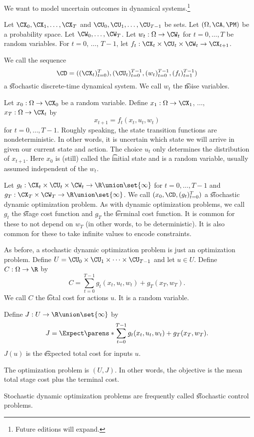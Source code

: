 

We want to model uncertain outcomes in dynamical systems.\footnote{Future editions will expand.}


Let $\CX_0, \CX_1, \dots, \CX_{T}$ and $\CU_0, \CU_1, \dots, \CU_{T-1}$ be sets.
Let $(\Omega, \CA, \PM)$ be a probability space.
Let $\CW_{0}, \dots, \CW_{T}$.
Let $w_{t}: \Omega \to \CW_{t}$ for $t = 0, \dots, T$ be random variables.
For $t = 0$, $\dots$, $T-1$, let $f_{t}: \CX_t \times \CU_t \times \CW_t \to \CX_{t+1}$.

We call the sequence
\[
	\CD = ((\CX_t)_{t = 0}^{T}), (\CU_t)_{t=0}^{T-1}, (w_t)_{t=0}^{T-1}, (f_t)_{t=1}^{T-1})
\]
a \t{stochastic discrete-time dynamical system}.
We call $w_t$ the \t{noise} variables.



Let $x_0: \Omega \to \CX_0$ be a random variable.
Define $x_1: \Omega \to \CX_1$, $\dots$, $x_T: \Omega \to \CX_t$ by
\[
    x_{t+1} = f_t(x_t, u_t, w_t)
\]
for $t = 0, \dots, T-1$.
Roughly speaking, the state transition functions are nondeterministic.
In other words, it is uncertain which state we will arrive in given our current state and action.
The choice $u_t$ only determines the distribution of $x_{t+1}$.
Here $x_0$ is (still) called the \t{initial state} and is a random variable, usually assumed independent of the $w_t$.

Let $g_t: \CX_t \times \CU_t \times \CW_t \to \R \union \set{\infty}$ for $t =0, \dots, T-1$ and $g_{T}: \CX_T \times \CW_T \to \R \union \set{\infty}$.
We call $(x_0, \CD, (g_t)_{t = 0}^{T})$ a \t{stochastic dynamic optimization problem}.
As with dynamic optimization problems, we call $g_t$ the \t{stage cost function} and $g_T$ the \t{terminal cost function}.
It is common for these to not depend on $w_T$ (in other words, to be deterministic).
It is also common for these to take infinite values to encode constraints.

As before, a stochastic dynamic optimization problem is just an optimization problem.
Define $U = \CU_0 \times \CU_1 \times \cdots \times \CU_{T-1}$ and let $u \in U$.
Define $C: \Omega \to \R$ by
\[
  C = \sum_{t = 0}^{T-1} g_t(x_t, u_t, w_t) + g_T(x_T, w_T).
\]
We call $C$ the \t{total cost} for actions $u$.
It is a random variable.

Define $J: U \to \R \union \set{\infty}$ by
\[
    J = \Expect \parens*{
          \sum_{t = 0}^{T-1} g_t(x_t, u_t, w_t) + g_T(x_T, w_T)
    }.
\]
$J(u)$ is the \t{expected total cost} for inputs $u$.

The optimization problem is $(U, J)$.
In other words, the objective is the mean total stage cost plus the terminal cost.


Stochastic dynamic optimization problems are frequently called \t{stochastic control problems}.
